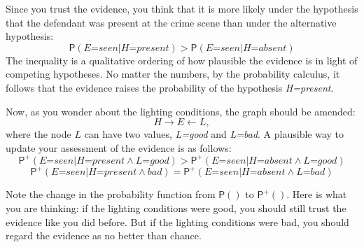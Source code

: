 \documentclass[
  11pt,
  dvipsnames,enabledeprecatedfontcommands]{scrartcl}
\newcommand{\pr}[1]{\ensuremath{\mathsf{P}(#1)}}
\newcommand{\ppr}[2]{\ensuremath{\mathsf{P}^{#1}(#2)}}
\begin{document}
Since you trust the evidence, you think that it is more likely under the
hypothesis that the defendant was present at the crime scene than under
the alternative hypothesis:
\[\pr{\textit{E=seen} \vert \textit{H=present}} > \pr{\textit{E=seen} \vert \textit{H=absent}}\]
The inequality is a qualitative ordering of how plausible the evidence
is in light of competing hypotheses. No matter the numbers, by the
probability calculus, it follows that the evidence raises the
probability of the hypothesis \textit{H=present}.

Now, as you wonder about the lighting conditions, the graph should be
amended: \[H \rightarrow E \leftarrow L,\] where the node \(L\) can have
two values, \textit{L=good} and \textit{L=bad}. A plausible way to
update your assessment of the evidence is as follows:
\[\ppr{+}{\textit{E=seen} \vert \textit{H=present} \wedge \textit{L=good}} > \ppr{+}{\textit{E=seen} \vert \textit{H=absent} \wedge \textit{L=good}}\]
\[\ppr{+}{\textit{E=seen} \vert \textit{H=present} \wedge \textit{bad}} = \ppr{+}{\textit{E=seen} \vert \textit{H=absent} \wedge \textit{L=bad}}\]

\noindent Note the change in the probability function from \(\pr{}\) to
\(\ppr{+}{}\). Here is what you are thinking: if the lighting conditions
were good, you should still trust the evidence like you did before. But
if the lighting conditions were bad, you should regard the evidence as
no better than chance.
\end{document}
